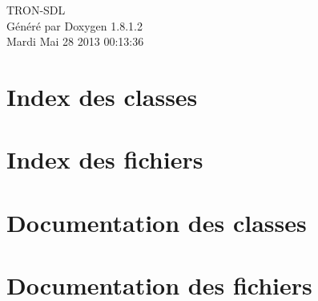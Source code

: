 \documentclass{book}
\begin{document}
\hypersetup{pageanchor=false,citecolor=blue}
\begin{titlepage}
\vspace*{7cm}
\begin{center}
{\Large T\-R\-O\-N-\/\-S\-D\-L }\\
\vspace*{1cm}
{\large Généré par Doxygen 1.8.1.2}\\
\vspace*{0.5cm}
{\small Mardi Mai 28 2013 00:13:36}\\
\end{center}
\end{titlepage}
\clearemptydoublepage
{}
\tableofcontents
\clearemptydoublepage
{}
\hypersetup{pageanchor=true,citecolor=blue}
\chapter{Index des classes}

\chapter{Index des fichiers}

\chapter{Documentation des classes}












\chapter{Documentation des fichiers}




























\printindex
\end{document}
